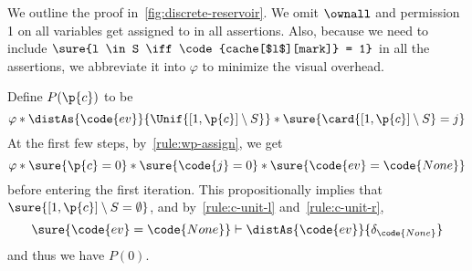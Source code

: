 We outline the proof in~\ref{fig:discrete-reservoir}.
We omit $\ownall$ and permission 1 on all variables get assigned to in all assertions.
Also, because we need to include $\sure{l \in S \iff \code{cache[$l$][mark]} = 1}$
in all the assertions,
we abbreviate it into $\varphi$ to minimize the visual overhead.

Define $P(\p{c})$ to be
\[
  \varphi \ast \distAs{\code{ev}}{\Unif{[1, \p{c}] \setminus S}} \ast \sure{\card{[1, \p{c}] \setminus S} = j}
\]
At the first few steps, by~\ref{rule:wp-assign},
we get
\[
  \varphi \ast \sure{\p{c} = 0} \ast \sure{\code{j} = 0} \ast \sure{\code{ev} = \code{None}}
\]
before entering the first iteration.
This propositionally implies that $\sure{[1, \p{c}] \setminus S = \emptyset}$,
and by~\ref{rule:c-unit-l} and~\ref{rule:c-unit-r},
\[
\sure{\code{ev} = \code{None}} \vdash \distAs{\code{ev}}{\delta_{\code{None}}}
\]
and thus we have $P(0)$.


